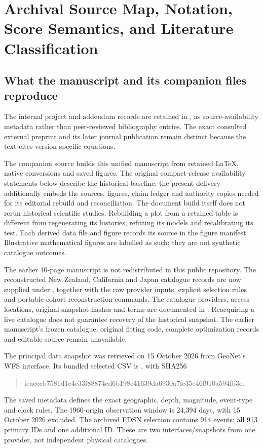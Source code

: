 \chapter{Archival Source Map, Notation, Score Semantics, and Literature Classification}\label{app:source-map}
\label{app:evidence}

\section{What the manuscript and its companion files reproduce}

The internal project and addendum records are retained in , as source-availability metadata rather than peer-reviewed bibliography entries. The exact consulted external preprint and its later journal publication remain distinct because the text cites version-specific equations.

The companion source builds this unified manuscript from retained LaTeX, native conversions and saved figures. The original compact-release availability statements below describe the historical baseline; the present delivery additionally embeds the sources, figures, claim ledger and authority copies needed for its editorial rebuild and reconciliation. The document build itself does not rerun historical scientific studies. Rebuilding a plot from a retained table is different from regenerating its histories, refitting its models and recalibrating its test. Each derived data file and figure records its source in the figure manifest. Illustrative mathematical figures are labelled as such; they are not synthetic catalogue outcomes.

The earlier 40-page manuscript is not redistributed in this public repository. The reconstructed New Zealand, California and Japan catalogue records are now supplied under , together with the raw provider inputs, explicit selection rules and portable cohort-reconstruction commands. The catalogue providers, access locations, original snapshot hashes and terms are documented in . Reacquiring a live catalogue does not guarantee recovery of the historical snapshot. The earlier manuscript's frozen catalogue, original fitting code, complete optimization records and editable source remain unavailable.

The principal data snapshot was retrieved on 15 October 2026 from GeoNet's WFS interface. Its bundled selected CSV is , with SHA256
\begin{quote}\small\ttfamily
feacccb7581d1c4c33f88874cd6b198c41639da6930a7fc35e46f910a594fb3e.
\end{quote}
The saved metadata defines the exact geographic, depth, magnitude, event-type and clock rules. The 1960-origin observation window is 24,394 days, with 15 October 2026 excluded. The archived FDSN selection contains 914 events: all 913 primary IDs and one additional ID. These are two interfaces/snapshots from one provider, not independent physical catalogues.

